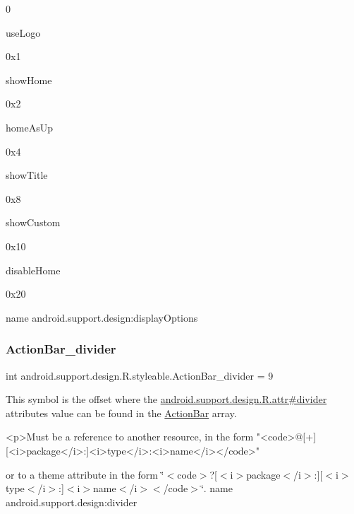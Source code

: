0

{\ttfamily use\+Logo}

0x1

{\ttfamily show\+Home}

0x2

{\ttfamily home\+As\+Up}

0x4

{\ttfamily show\+Title}

0x8

{\ttfamily show\+Custom}

0x10

{\ttfamily disable\+Home}

0x20

name android.\+support.\+design\+:display\+Options \mbox{\label{classandroid_1_1support_1_1design_1_1R_1_1styleable_a3de1d07d052e4c273b08980969a62a70}} 
\subsubsection{\texorpdfstring{Action\+Bar\+\_\+divider}{ActionBar\_divider}}
{\footnotesize\ttfamily int android.\+support.\+design.\+R.\+styleable.\+Action\+Bar\+\_\+divider = 9\hspace{0.3cm}{\ttfamily [static]}}

This symbol is the offset where the \hyperlink{classandroid_1_1support_1_1design_1_1R_1_1attr_aaec83d2f909bf7da00e50359ec0806ac}{android.\+support.\+design.\+R.\+attr\#divider} attribute\textquotesingle{}s value can be found in the \hyperlink{classandroid_1_1support_1_1design_1_1R_1_1styleable_ab795220a96557d11f8c21359b95bed82}{Action\+Bar} array.

\begin{DoxyVerb}      <p>Must be a reference to another resource, in the form "<code>@[+][<i>package</i>:]<i>type</i>:<i>name</i></code>"
\end{DoxyVerb}
 or to a theme attribute in the form \char`\"{}$<$code$>$?\mbox{[}$<$i$>$package$<$/i$>$\+:\mbox{]}\mbox{[}$<$i$>$type$<$/i$>$\+:\mbox{]}$<$i$>$name$<$/i$>$$<$/code$>$\char`\"{}.  name android.\+support.\+design\+:divider \mbox{\label{classandroid_1_1support_1_1design_1_1R_1_1styleable_a8e93fa7b188ab181bc2723837301eaff}} 

